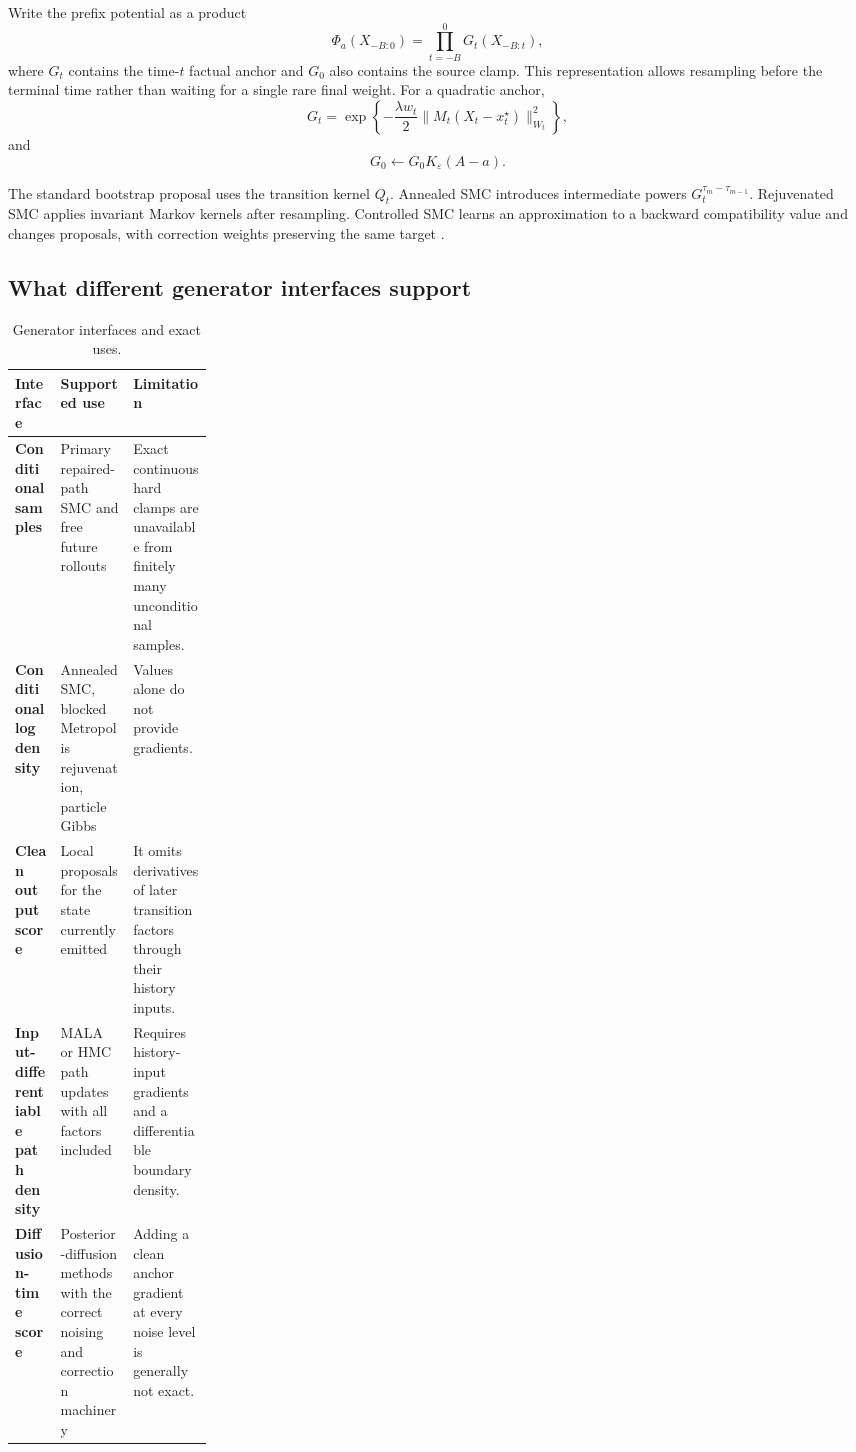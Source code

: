 \documentclass{article}
\newcommand{\eps}{\varepsilon}
\theoremstyle{remark}
\begin{document}
Write the prefix potential as a product
\[
  \Phi_a(X_{-B:0})
  =
  \prod_{t=-B}^{0}G_t(X_{-B:t}),
\]
where \(G_t\) contains the time-\(t\) factual anchor and \(G_0\) also contains
the source clamp. This representation allows resampling before the terminal
time rather than waiting for a single rare final weight. For a quadratic
anchor,
\[
  G_t
  =
  \exp\left\{
    -\frac{\lambda w_t}{2}
    \|M_t(X_t-x_t^\star)\|_{W_t}^2
  \right\},
\]
and
\[
  G_0
  \leftarrow
  G_0K_\eps(A-a).
\]

The standard bootstrap proposal uses the transition kernel \(Q_t\). Annealed
SMC introduces intermediate powers \(G_t^{\tau_m-\tau_{m-1}}\). Rejuvenated
SMC applies invariant Markov kernels after resampling. Controlled SMC learns
an approximation to a backward compatibility value and changes proposals,
with correction weights preserving the same target
\citep{heng2020controlled}.

\subsection{What different generator interfaces support}
\label{app:interfaces}

\begin{table}[h]
\centering
\small
\caption{Generator interfaces and exact uses.}
\label{tab:interfaces-app}
\begin{tabularx}{\linewidth}{>{\bfseries}p{0.23\linewidth}XX}
\toprule
Interface & Supported use & Limitation \\
\midrule
Conditional samples &
Primary repaired-path SMC and free future rollouts &
Exact continuous hard clamps are unavailable from finitely many unconditional
samples.\\
Conditional log density &
Annealed SMC, blocked Metropolis rejuvenation, particle Gibbs &
Values alone do not provide gradients.\\
Clean output score &
Local proposals for the state currently emitted &
It omits derivatives of later transition factors through their history
inputs.\\
Input-differentiable path density &
MALA or HMC path updates with all factors included &
Requires history-input gradients and a differentiable boundary density.\\
Diffusion-time score &
Posterior-diffusion methods with the correct noising and correction machinery &
Adding a clean anchor gradient at every noise level is generally not exact.\\
\bottomrule
\end{tabularx}
\end{table}
\end{document}
